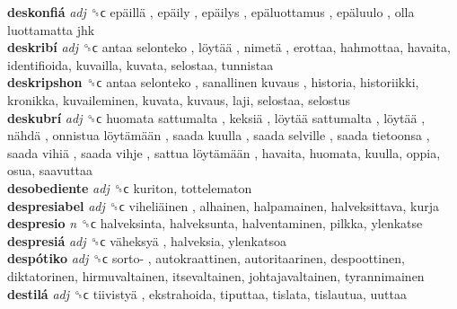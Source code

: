 \textbf{deskonfiá} \emph{adj}  ␝ϲ   epäillä ,  epäily ,  epäilys ,  epäluottamus ,  epäluulo ,  olla luottamatta jhk   \\
\textbf{deskribí} \emph{adj}  ␝ϲ   antaa selonteko ,  löytää ,  nimetä , erottaa, hahmottaa, havaita, identifioida, kuvailla, kuvata, selostaa, tunnistaa  \\
\textbf{deskripshon} ␝ϲ   antaa selonteko ,  sanallinen kuvaus , historia, historiikki, kronikka, kuvaileminen, kuvata, kuvaus, laji, selostaa, selostus  \\
\textbf{deskubrí} \emph{adj}  ␝ϲ   huomata sattumalta ,  keksiä ,  löytää sattumalta ,  löytää ,  nähdä ,  onnistua löytämään ,  saada kuulla ,  saada selville ,  saada tietoonsa ,  saada vihiä ,  saada vihje ,  sattua löytämään , havaita, huomata, kuulla, oppia, osua, saavuttaa  \\
\textbf{desobediente} \emph{adj}  ␝ϲ  kuriton, tottelematon  \\
\textbf{despresiabel} \emph{adj}  ␝ϲ   viheliäinen , alhainen, halpamainen, halveksittava, kurja  \\
\textbf{despresio} \emph{n}  ␝ϲ  halveksinta, halveksunta, halventaminen, pilkka, ylenkatse  \\
\textbf{despresiá} \emph{adj}  ␝ϲ   väheksyä , halveksia, ylenkatsoa  \\
\textbf{despótiko} \emph{adj}  ␝ϲ   sorto- , autokraattinen, autoritaarinen, despoottinen, diktatorinen, hirmuvaltainen, itsevaltainen, johtajavaltainen, tyrannimainen  \\
\textbf{destilá} \emph{adj}  ␝ϲ   tiivistyä , ekstrahoida, tiputtaa, tislata, tislautua, uuttaa  \\
